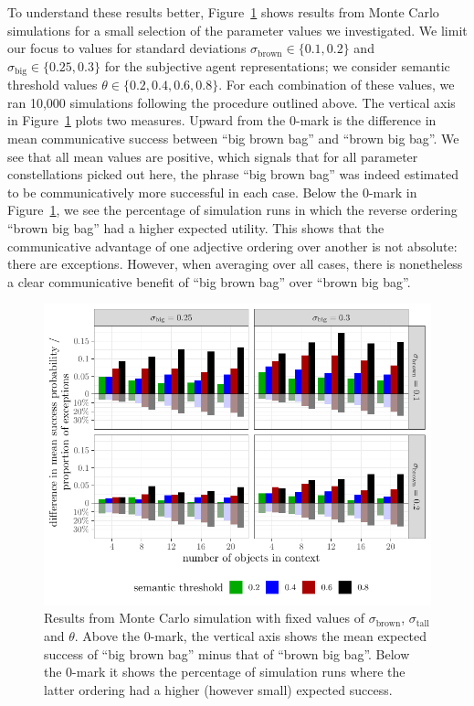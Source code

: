 \documentclass[10pt,a4paper]{article}
\begin{document}
To understand these results better, Figure~\ref{fig:Showcase_examples} shows results from Monte Carlo simulations for a small selection of the parameter values we investigated. We limit our focus to values for standard deviations $\sigma_{\text{brown}} \in \{0.1, 0.2\}$ and $\sigma_{\text{big}} \in \{0.25, 0.3\}$ for the subjective agent representations; we consider semantic threshold values $\theta \in \{ 0.2, 0.4, 0.6, 0.8 \}$. For each combination of these values, we ran 10,000 simulations following the procedure outlined above. The vertical axis in Figure~\ref{fig:Showcase_examples} plots two measures. Upward from the 0-mark is the difference in mean communicative success between ``big brown bag'' and ``brown big bag''. We see that all mean values are positive, which signals that for all parameter constellations picked out here, the phrase ``big brown bag'' was indeed estimated to be communicatively more successful in each case. Below the 0-mark in Figure~\ref{fig:Showcase_examples}, we see the percentage of simulation runs in which the reverse ordering ``brown big bag'' had a higher expected utility. This shows that the communicative advantage of one adjective ordering over another is not absolute: there are exceptions. However, when averaging over all cases, there is nonetheless a clear communicative benefit of ``big brown bag'' over ``brown big bag''.

\begin{figure}
  \centering
  \includegraphics[width = \linewidth]{plots/tikz_combined.pdf}
   \vspace{-25pt}
  \caption{Results from Monte Carlo simulation with fixed values of $\sigma_{\text{brown}}$, $\sigma_{\text{tall}}$ and $\theta$. Above the 0-mark, the vertical axis shows the mean expected success of ``big brown bag'' minus that of ``brown big bag''. Below the 0-mark it shows the percentage of simulation runs where the latter ordering had a higher (however small) expected success.}
  \label{fig:Showcase_examples}
\end{figure}
\end{document}
